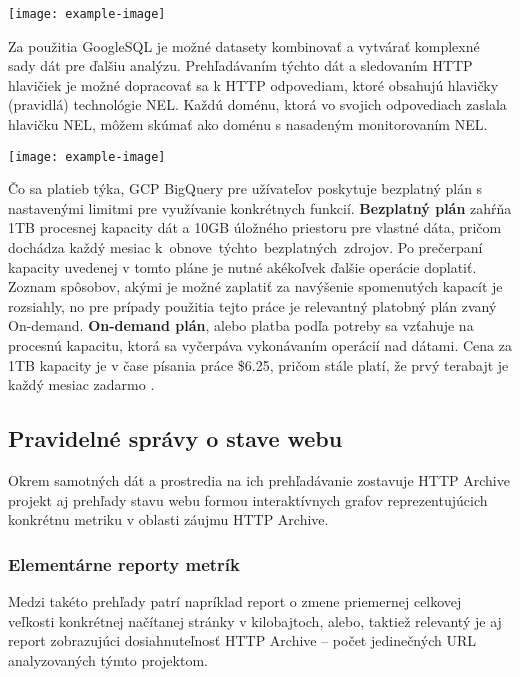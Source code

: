 \pagebreak

\begin{center}
\noindent\texttt{[image: example-image]}    
\end{center}


Za použitia GoogleSQL je možné datasety kombinovať a vytvárať komplexné sady dát pre ďalšiu analýzu.
Prehľadávaním týchto dát a sledovaním HTTP hlavičiek je možné dopracovať sa k HTTP odpovediam, ktoré obsahujú hlavičky (pravidlá) technológie NEL.
Každú doménu, ktorá vo svojich odpovediach zaslala hlavičku NEL, môžem skúmať ako doménu s nasadeným monitorovaním NEL.

\begin{center}
\noindent\texttt{[image: example-image]}    
\end{center}

Čo sa platieb týka, GCP BigQuery pre užívateľov poskytuje bezplatný plán s nastavenými limitmi pre využívanie konkrétnych funkcií.
\textbf{Bezplatný plán} zahŕňa 1TB procesnej kapacity dát a 10GB úložného priestoru pre vlastné dáta, pričom dochádza každý mesiac \mbox{k obnove týchto bezplatných zdrojov}.
Po prečerpaní kapacity uvedenej v tomto pláne je nutné akékoľvek ďalšie operácie doplatiť.
Zoznam spôsobov, akými je možné zaplatiť za navýšenie spomenutých kapacít je rozsiahly, no pre prípady použitia tejto práce je relevantný platobný plán zvaný On-demand.
\textbf{On-demand plán}, alebo platba podľa potreby sa vzťahuje na procesnú kapacitu, ktorá sa vyčerpáva vykonávaním operácií nad dátami.
Cena za 1TB kapacity je v čase písania práce \$6.25, pričom stále platí, že prvý terabajt je každý mesiac zadarmo \cite{google-bq-pricing}.

\pagebreak

\subsection{Pravidelné správy o stave webu}

Okrem samotných dát a prostredia na ich prehľadávanie zostavuje HTTP Archive projekt aj prehľady stavu webu formou interaktívnych grafov reprezentujúcich konkrétnu metriku v oblasti záujmu HTTP Archive.

\subsubsection{Elementárne reporty metrík}
Medzi takéto prehľady patrí napríklad report o zmene priemernej celkovej veľkosti konkrétnej načítanej stránky v kilobajtoch, alebo, taktiež relevantý je aj report zobrazujúci dosiahnuteľnosť HTTP Archive -- počet jedinečných URL analyzovaných týmto projektom.

